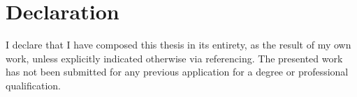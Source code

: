 \chapter{Declaration}
I declare that I have composed this thesis in its entirety, as the result
of my own work, unless explicitly indicated otherwise via referencing.
The presented work has not been submitted for any previous application
for a degree or professional qualification.
